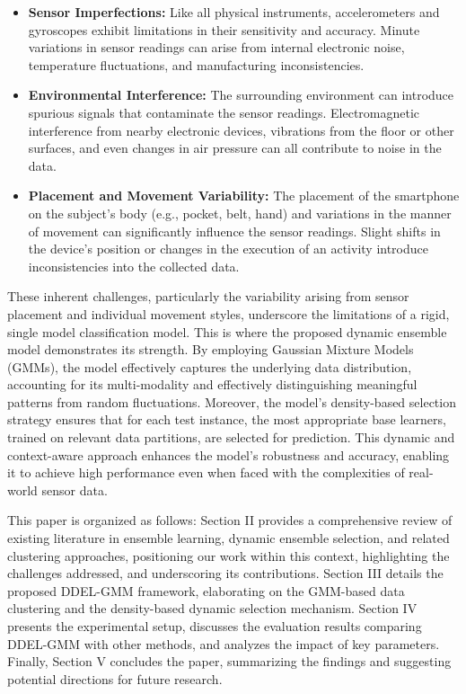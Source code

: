 \documentclass[lettersize,journal]{IEEEtran}
\newcommand{\greenhighlight}[1]{\textcolor{highlightgreen}{#1}}
\begin{document}
	\begin{itemize}
		\item \textbf{Sensor Imperfections:} Like all physical instruments, accelerometers and gyroscopes exhibit limitations in their sensitivity and accuracy. Minute variations in sensor readings can arise from internal electronic noise, temperature fluctuations, and manufacturing inconsistencies. 
		\item \textbf{Environmental Interference:} The surrounding environment can introduce spurious signals that contaminate the sensor readings. Electromagnetic interference from nearby electronic devices, vibrations from the floor or other surfaces, and even changes in air pressure can all contribute to noise in the data. 
		\item \textbf{Placement and Movement Variability:} The placement of the smartphone on the subject's body (e.g., pocket, belt, hand) and variations in the manner of movement can significantly influence the sensor readings. Slight shifts in the device's position or changes in the execution of an activity introduce inconsistencies into the collected data. 
	\end{itemize}

	These inherent challenges, particularly the variability arising from sensor placement and individual movement styles, underscore the limitations of a rigid, single model classification model.
	 This is where the proposed dynamic ensemble model demonstrates its strength. By employing Gaussian Mixture Models (GMMs), the model effectively captures the underlying data distribution, accounting for its multi-modality and effectively distinguishing meaningful patterns from random fluctuations. Moreover, the model’s density-based selection strategy ensures that for each test instance, the most appropriate base learners, trained on relevant data partitions, are selected for prediction. This dynamic and context-aware approach enhances the model's robustness and accuracy, enabling it to achieve high performance even when faced with the complexities of real-world sensor data.
	
	\greenhighlight{
		This paper is organized as follows: 
		Section II provides a comprehensive review of existing literature in ensemble learning, dynamic ensemble selection, and related clustering approaches, positioning our work within this context, highlighting the challenges addressed, and underscoring its contributions. Section III details the proposed DDEL-GMM framework, elaborating on the GMM-based data clustering and the density-based dynamic selection mechanism. Section IV presents the experimental setup, discusses the evaluation results comparing DDEL-GMM with other methods, and analyzes the impact of key parameters. Finally, Section V concludes the paper, summarizing the findings and suggesting potential directions for future research.
	}
\end{document}
